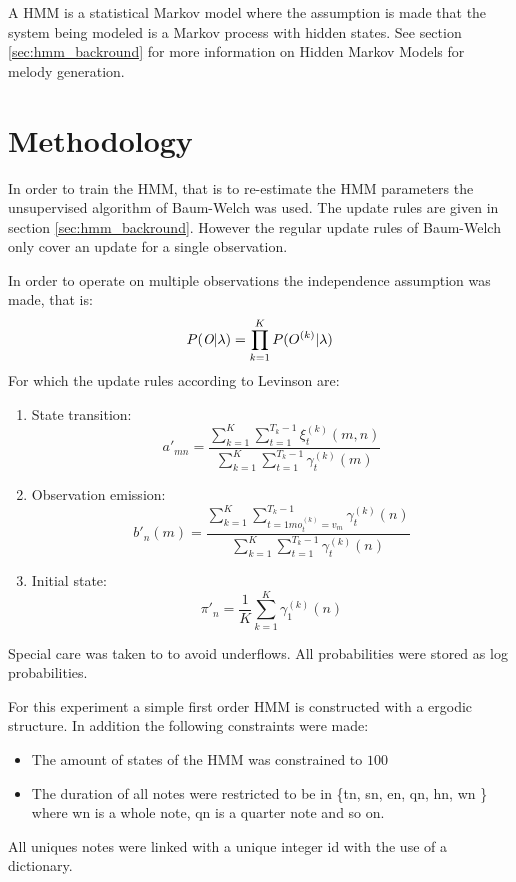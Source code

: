 A \ac{HMM} is a statistical Markov model where the assumption is made that the system being modeled  is a Markov process with hidden states. See section \ref{sec:hmm_backround} for more information on Hidden Markov Models for melody generation.

\section{Methodology}
In order to train the \ac{HMM}, that is to re-estimate the \ac{HMM} parameters the unsupervised algorithm of Baum-Welch was used. The update rules are given in section \ref{sec:hmm_backround}. However the regular update rules of Baum-Welch only cover an update for a single observation.

In order to operate on multiple observations the independence assumption was made, that is:
\[ P(\emph{O} | \lambda) = \prod_{k=1}^K P(O^{(k)} | \lambda) \]
For which the update rules according to Levinson are:
\begin{enumerate}
\item State transition:
\[ a'_{mn} = \frac{\sum^K_{k=1} \sum^{T_k -1 }_{t=1} \xi^{(k)}_t (m,n)}{\sum^K_{k=1} \sum^{T_k-1}_{t=1} \gamma_t^{(k)}(m)} \]

\item Observation emission:
\[ b'_n (m) = \frac{\sum^K_{k=1} \sum^{T_k -1 }_{t=1m o_t^{(k)} = v_m} \gamma^{(k)}_t (n)}{\sum^K_{k=1} \sum^{T_k-1}_{t=1} \gamma_t^{(k)}(n)} \]

\item Initial state:
\[ \pi'_n = \frac{1}{K} \sum^K_{k=1} \gamma_1^{(k)}(n)  \]

\end{enumerate}

Special care was taken to to avoid underflows. All probabilities were stored as log probabilities.


For this experiment a simple first order \ac{HMM} is constructed with a ergodic structure. In addition the following constraints were made:
\begin{itemize}
\item The amount of states of the \ac{HMM} was constrained to $100$
\item The duration of all notes were restricted to be in \{tn, sn, en, qn, hn, wn \} where wn is a whole note, qn is a quarter note and so on. 
\end{itemize}

All uniques notes were linked with a unique integer id with the use of a dictionary. 

